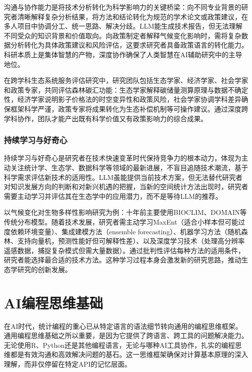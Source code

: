 \documentclass[
  twoside,12pt,fontset=none]{ctexbook}
\begin{document}
沟通与协作能力是将技术分析转化为科学影响力的关键桥梁：向不同专业背景的研究者清晰解释复杂分析结果，将方法和结论转化为规范的学术论文或政策建议，在多人项目中协调分工、统一思路、解决分歧。LLM能生成技术报告，但无法理解不同受众的知识背景和价值取向。向政策制定者解释气候变化影响时，需将复杂数据分析转化为具体政策建议和风险评估，这要求研究者具备政策语言的转化能力。科研本质上是集体智慧的产物，深度协作确保了人类智慧在AI辅助研究中的主导地位。

在跨学科生态系统服务评估研究中，研究团队包括生态学家、经济学家、社会学家和政策专家，共同评估森林碳汇功能：生态学家解释碳储量测算原理与数据不确定性，经济学家说明影子价格法的时空变异性和政策风险，社会学家协调学科差异确保框架科学严谨，政策专家将成果转化为生态补偿机制等可操作建议。通过深度跨学科协作，团队才能产出既有科学价值又有政策影响力的综合成果。

\hypertarget{ux6301ux7eedux5b66ux4e60ux4e0eux597dux5947ux5fc3}{%
\subsubsection{持续学习与好奇心}\label{ux6301ux7eedux5b66ux4e60ux4e0eux597dux5947ux5fc3}}

持续学习与好奇心是研究者在技术快速变革时代保持竞争力的根本动力，体现为主动关注统计学、生态学、数据科学等领域的最新进展，不盲目追随技术潮流，基于科学需求评估新技术的适用性。LLM虽能提供当前技术方案，但无法替代研究者对知识发展方向的判断和对新兴机遇的把握，当新的空间统计方法出现时，研究者需要主动学习并评估其在生态学中的应用潜力，而不是等待LLM的推荐。

以气候变化对生物多样性影响研究为例：十年前主要使用BIOCLIM、DOMAIN等传统分布模型。随着技术发展，研究者需主动学习MaxEnt（适合小样本但可能过度依赖环境变量）、集成建模方法（ensemble forecasting）、机器学习方法（随机森林、支持向量机，预测性能好但可解释性差）、以及深度学习技术（处理高分辨率遥感数据，捕捉复杂模式但需大量数据）。通过批判性评估每种方法的适用条件，研究者能选择最合适的技术方法。这种学习过程本身会激发新的研究思路，推动生态学研究的创新发展。

\hypertarget{aiux7f16ux7a0bux601dux7ef4ux57faux7840}{%
\section{AI编程思维基础}\label{aiux7f16ux7a0bux601dux7ef4ux57faux7840}}

在AI时代，统计编程的重心已从特定语言的语法细节转向通用的编程思维框架。通用编程思维基础之所以重要，是因为它提供了跨语言、跨工具的问题解决能力。无论使用R、Python还是其他编程语言，无论与哪种AI工具协作，扎实的编程思维都是有效沟通和高效解决问题的基石。这一思维框架确保对计算基本原理的深入理解，而非仅停留在特定API的记忆层面。
\end{document}
